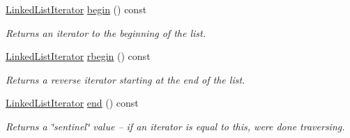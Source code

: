 \begin{DoxyCompactItemize}
\mbox{\hyperlink{classssuds_1_1_linked_list_1_1_linked_list_iterator}{Linked\+List\+Iterator}} \mbox{\hyperlink{classssuds_1_1_linked_list_ad3559cd0af6c9cf13fe03d0c1e164145}{begin}} () const
\begin{DoxyCompactList}\small\item\em Returns an iterator to the beginning of the list. \end{DoxyCompactList}\item 
\mbox{\label{classssuds_1_1_linked_list_ac2f6bc415ab03bd173a9d72184bd7bf2}} 
\mbox{\hyperlink{classssuds_1_1_linked_list_1_1_linked_list_iterator}{Linked\+List\+Iterator}} \mbox{\hyperlink{classssuds_1_1_linked_list_ac2f6bc415ab03bd173a9d72184bd7bf2}{rbegin}} () const
\begin{DoxyCompactList}\small\item\em Returns a reverse iterator starting at the end of the list. \end{DoxyCompactList}\item 
\mbox{\label{classssuds_1_1_linked_list_aef5c9df067fff37d377ad142df3f7f92}} 
\mbox{\hyperlink{classssuds_1_1_linked_list_1_1_linked_list_iterator}{Linked\+List\+Iterator}} \mbox{\hyperlink{classssuds_1_1_linked_list_aef5c9df067fff37d377ad142df3f7f92}{end}} () const
\begin{DoxyCompactList}\small\item\em Returns a \char`\"{}sentinel\char`\"{} value -- if an iterator is equal to this, we\textquotesingle{}re done traversing. \end{DoxyCompactList}\end{DoxyCompactItemize}
